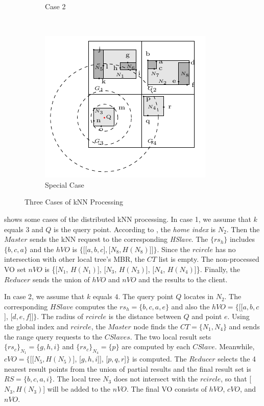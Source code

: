 \begin{figure}[t]
\begin{subfigure}[b]{.33\linewidth}
    \caption{Case 2}\label{fig:knn:cases:case2}
  \end{subfigure}~%
  \begin{subfigure}[b]{.313\linewidth}
    \centering
    \includegraphics[width=\linewidth]{figs/knn/specialcase.pdf}
    \caption{Special Case}\label{fig:knn:cases:specialcase}
  \end{subfigure}
  \caption{Three Cases of {kNN} Processing}\label{fig:knn:cases}
\end{figure}

 shows some cases of the distributed kNN processing. In case 1, we assume that $k$ equals 3 and $Q$ is the query point. According to , the \emph{home index} is $N_{2}$. Then the $Master$ sends the kNN request to the corresponding \emph{HSlave}. The $\{rs_{h}\}$ includes $\{b, c, a\}$ and the $hVO$ is $\{\textrm{[[}a, b, c\textrm{]}, \textrm{[}N_{8}, H(N_{8})\textrm{]]}\}$. Since the $rcircle$  has no intersection with other local tree's MBR, the $CT$ list is empty. The non-processed VO set $nVO$ is \{[$N_{1}$, $H(N_{1})$], [$N_{3}$, $H(N_{3})$], [$N_{4}$, $H(N_{4})$]\}. Finally, the $Reducer$ sends the union of $hVO$ and $nVO$ and the results to the client.

In case 2, we assume that $k$ equals $4$. The query point $Q$ locates in $N_{2}$. The corresponding $HSlave$ computes the $rs_{h}=\{b, c, a, e\}$ and also the $hVO=\{$[[$a, b, c$], [$d, e, f$]]$\}$. The radius of $rcircle$ is the distance between $Q$ and point $e$. Using the global index and $rcircle$, the $Master$ node finds the $CT=\{N_{1}, N_{4}\}$ and sends the range query requests to the $CSlaves$. The two local result sets ${\{rs_{c}\}}_{N_{1}}=\{g, h, i\}$ and ${\{rs_{c}\}}_{N_{4}}=\{p\}$ are computed by each $CSlave$. Meanwhile, $cVO=\{$[[$N_{5}, H(N_{5})$], [$g, h, i$]], [$p, q, r$]$\}$ is computed. The $Reducer$ selects the 4 nearest result points from the union of partial results and the final result set is $RS=\{b, c, a, i\}$. The local tree $N_{3}$ does not intersect with the $rcircle$, so that [$N_{3}, H(N_{3})$] will be added to the $nVO$. The final VO consists of $hVO$, $cVO$, and $nVO$.

